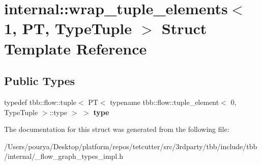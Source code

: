 \hypertarget{structinternal_1_1wrap__tuple__elements_3_011_00_01PT_00_01TypeTuple_01_4}{}\section{internal\+:\+:wrap\+\_\+tuple\+\_\+elements$<$ 1, P\+T, Type\+Tuple $>$ Struct Template Reference}
\label{structinternal_1_1wrap__tuple__elements_3_011_00_01PT_00_01TypeTuple_01_4}
\subsection*{Public Types}
\begin{DoxyCompactItemize}
\item 
\hypertarget{structinternal_1_1wrap__tuple__elements_3_011_00_01PT_00_01TypeTuple_01_4_a7727e3cefb35b98e57ed21f3b625fdb5}{}typedef tbb\+::flow\+::tuple$<$ P\+T$<$ typename tbb\+::flow\+::tuple\+\_\+element$<$ 0, Type\+Tuple $>$\+::type $>$ $>$ {\bfseries type}\label{structinternal_1_1wrap__tuple__elements_3_011_00_01PT_00_01TypeTuple_01_4_a7727e3cefb35b98e57ed21f3b625fdb5}

\end{DoxyCompactItemize}


The documentation for this struct was generated from the following file\+:\begin{DoxyCompactItemize}
\item 
/\+Users/pourya/\+Desktop/platform/repos/tetcutter/src/3rdparty/tbb/include/tbb/internal/\+\_\+flow\+\_\+graph\+\_\+types\+\_\+impl.\+h\end{DoxyCompactItemize}
